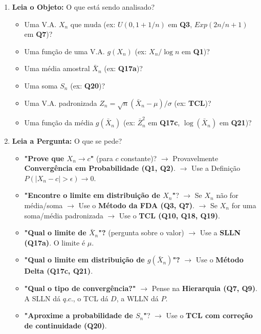 \documentclass[a4paper, 10pt]{article} %
\theoremstyle{definition}
\theoremstyle{plain}
\theoremstyle{remark}
\newcommand{\Xn}{\bar{X}_n}             %
\begin{document}
\begin{enumerate}
    \item \textbf{Leia o Objeto:} O que está sendo analisado?
    \begin{itemize}
        \item Uma V.A. $X_n$ que muda (ex: $U(0, 1+1/n)$ em \textbf{Q3}, $Exp(2n/n+1)$ em \textbf{Q7})?
        \item Uma função de uma V.A. $g(X_n)$ (ex: $X_n / \log n$ em \textbf{Q1})?
        \item Uma média amostral $\Xn$ (ex: \textbf{Q17a})?
        \item Uma soma $S_n$ (ex: \textbf{Q20})?
        \item Uma V.A. padronizada $Z_n = \sqrt{n}(\Xn - \mu) / \sigma$ (ex: \textbf{TCL})?
        \item Uma função da média $g(\Xn)$ (ex: $\bar{Z}_n^2$ em \textbf{Q17c}, $\log(\Xn)$ em \textbf{Q21})?
    \end{itemize}

    \item \textbf{Leia a Pergunta:} O que se pede?
    \begin{itemize}
        \item \textbf{"Prove que $X_n \to c$"} (para $c$ constante)?
        $\to$ Provavelmente \textbf{Convergência em Probabilidade (Q1, Q2)}.
        $\to$ Use a Definição $P(|X_n - c| > \epsilon) \to 0$.

        \item \textbf{"Encontre o limite em distribuição de $X_n$"}?
        $\to$ Se $X_n$ não for média/soma $\to$ Use o \textbf{Método da FDA (Q3, Q7)}.
        $\to$ Se $X_n$ for uma soma/média padronizada $\to$ Use o \textbf{TCL (Q10, Q18, Q19)}.

        \item \textbf{"Qual o limite de $\Xn$"?} (pergunta sobre o valor)
        $\to$ Use a \textbf{SLLN (Q17a)}. O limite é $\mu$.

        \item \textbf{"Qual o limite em distribuição de $g(\Xn)$"?}
        $\to$ Use o \textbf{Método Delta (Q17c, Q21)}.

        \item \textbf{"Qual o tipo de convergência?"}
        $\to$ Pense na \textbf{Hierarquia (Q7, Q9)}. A SLLN dá $q.c.$, o TCL dá $D$, a WLLN dá $P$.

        \item \textbf{"Aproxime a probabilidade de $S_n$"}?
        $\to$ Use o \textbf{TCL com correção de continuidade (Q20)}.
    \end{itemize}
\end{enumerate}
\end{document}

